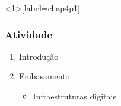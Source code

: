 \documentclass[aspectratio=43,8pt]{beamer}%
\begin{document}
\begin{frame}<1>[label=chap4p1]
	\frametitle{Atividade}
	\begin{keypoint}
		
		\begin{enumerate}
			\item Introdução 
\pause
			\item Embasamento 	
				\begin{itemize}
\pause
					\item Infraestruturas digitais
					\end{itemize} 
\pause
		\end{enumerate} 
	\end{keypoint}
\end{frame}
\end{document}
